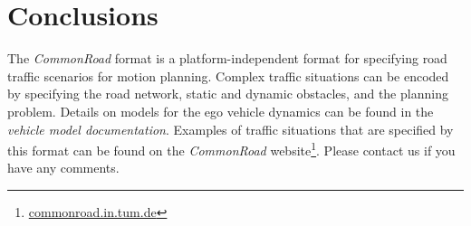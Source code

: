 

\section{Conclusions}

The \textit{CommonRoad} format is a platform-independent format for specifying road traffic scenarios for motion planning. 
Complex traffic situations can be encoded by specifying the road network, static and dynamic obstacles, and the planning problem. 
Details on models for the ego vehicle dynamics can be found in the \textit{vehicle model documentation}. Examples of traffic situations that are specified by this format can be found on the \textit{CommonRoad} website\footnote{\href{https://commonroad.in.tum.de}{commonroad.in.tum.de}}. 
Please contact us if you have any comments.

